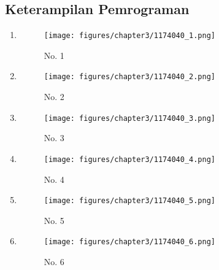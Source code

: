     \subsection{Keterampilan Pemrograman}
        \begin{enumerate}

            \item 
                    \begin{figure}[ht]
            \centerline{\texttt{[image: figures/chapter3/1174040\_1.png]}}
            \caption{No. 1}
            \label{1174040_no1}
            \end{figure}

            \item 
            \begin{figure}[ht]
            \centerline{\texttt{[image: figures/chapter3/1174040\_2.png]}}
            \caption{No. 2}
            \label{1174040_no2}
            \end{figure}

            \item 
            \begin{figure}[ht]
            \centerline{\texttt{[image: figures/chapter3/1174040\_3.png]}}
            \caption{No. 3}
            \label{1174040_no3}
            \end{figure}

            \item 
            \begin{figure}[ht]
            \centerline{\texttt{[image: figures/chapter3/1174040\_4.png]}}
            \caption{No. 4}
            \label{1174040_no4}
            \end{figure}

            \item 
            \begin{figure}[ht]
            \centerline{\texttt{[image: figures/chapter3/1174040\_5.png]}}
            \caption{No. 5}
            \label{1174040_no5}
            \end{figure}

            \item 
            \begin{figure}[ht]
            \centerline{\texttt{[image: figures/chapter3/1174040\_6.png]}}
            \caption{No. 6}
            \label{1174040_no6}
            \end{figure}


\end{enumerate}
